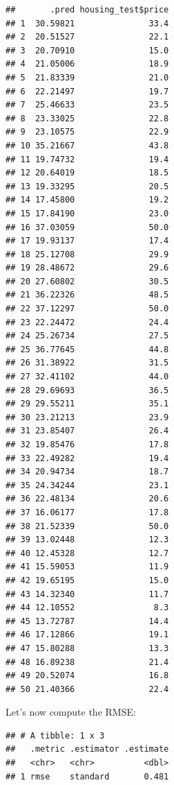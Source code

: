 \documentclass[]{gitbook}
\newenvironment{Shaded}{\begin{snugshade}}{\end{snugshade}}
\newcommand{\KeywordTok}[1]{\textcolor[rgb]{0.13,0.29,0.53}{\textbf{#1}}}
\newcommand{\NormalTok}[1]{#1}
\newcommand{\OperatorTok}[1]{\textcolor[rgb]{0.81,0.36,0.00}{\textbf{#1}}}
\newcommand{\StringTok}[1]{\textcolor[rgb]{0.31,0.60,0.02}{#1}}
\theoremstyle{definition}
\theoremstyle{definition}
\theoremstyle{definition}
\theoremstyle{remark}
\begin{document}
\begin{verbatim}
##       .pred housing_test$price
## 1  30.59821               33.4
## 2  20.51527               22.1
## 3  20.70910               15.0
## 4  21.05006               18.9
## 5  21.83339               21.0
## 6  22.21497               19.7
## 7  25.46633               23.5
## 8  23.33025               22.8
## 9  23.10575               22.9
## 10 35.21667               43.8
## 11 19.74732               19.4
## 12 20.64019               18.5
## 13 19.33295               20.5
## 14 17.45800               19.2
## 15 17.84190               23.0
## 16 37.03059               50.0
## 17 19.93137               17.4
## 18 25.12708               29.9
## 19 28.48672               29.6
## 20 27.60802               30.5
## 21 36.22326               48.5
## 22 37.12297               50.0
## 23 22.24472               24.4
## 24 25.26734               27.5
## 25 36.77645               44.8
## 26 31.38922               31.5
## 27 32.41102               44.0
## 28 29.69693               36.5
## 29 29.55211               35.1
## 30 23.21213               23.9
## 31 23.85407               26.4
## 32 19.85476               17.8
## 33 22.49282               19.4
## 34 20.94734               18.7
## 35 24.34244               23.1
## 36 22.48134               20.6
## 37 16.06177               17.8
## 38 21.52339               50.0
## 39 13.02448               12.3
## 40 12.45328               12.7
## 41 15.59053               11.9
## 42 19.65195               15.0
## 43 14.32340               11.7
## 44 12.10552                8.3
## 45 13.72787               14.4
## 46 17.12866               19.1
## 47 15.80288               13.3
## 48 16.89238               21.4
## 49 20.52074               16.8
## 50 21.40366               22.4
\end{verbatim}

Let's now compute the RMSE:

\begin{Shaded}
\end{Shaded}

\begin{verbatim}
## # A tibble: 1 x 3
##   .metric .estimator .estimate
##   <chr>   <chr>          <dbl>
## 1 rmse    standard       0.481
\end{verbatim}
\end{document}
